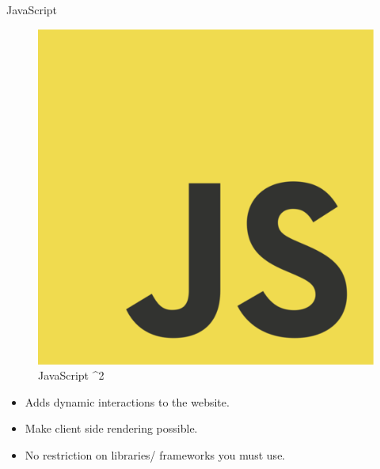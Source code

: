 \documentclass[aspectratio=169,9pt]{beamer}
\begin{document}
\begin{frame}{JavaScript}
\begin{figure}
        \begin{center}
            \includegraphics[scale=.15]{./images/javascript.png}
            \caption{JavaScript ^2}
        \end{center} 
    \end{figure}
\begin{itemize}
    \item Adds dynamic interactions to the website.
    \item Make client side rendering possible.
    \item No restriction on libraries/ frameworks you must use.
\end{itemize} 
\end{frame}
\end{document}
